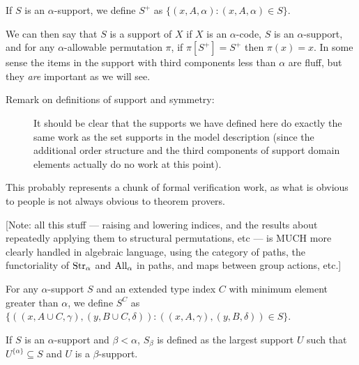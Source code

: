 If $S$ is an $\alpha$-support, we define $S^+$ as $\{(x,A,\alpha):(x,A,\alpha) \in S\}$.

We can then say that $S$ is a support of $X$ if $X$ is an $\alpha$-code, $S$ is an $\alpha$-support, and for any $\alpha$-allowable permutation $\pi$, if $\pi[S^+]=S^+$ then $\pi(x)=x$.  In some sense the items in the support with third components less than $\alpha$ are fluff, but they {\em are\/} important as we will see.

\begin{description}
\item[Remark on definitions of support and symmetry:]  It should be clear that the supports we have defined here do exactly the same work as the set supports in the model description (since the additional order structure and the third components of support domain elements actually do no work at this point).
\end{description}

This probably represents a chunk of formal verification work, as what is obvious to people is not always obvious to theorem provers.

\begin{definition}
\label {def:raise-lower-index}
[Note: all this stuff — raising and lowering indices, and the results about repeatedly applying them to structural permutations, etc — is MUCH more clearly handled in algebraic language, using the category of paths, the functoriality of $\mathrm{Str}_\alpha$ and $\mathrm{All}_\alpha$ in paths, and maps between group actions, etc.]

For any $\alpha$-support $S$ and an extended type index $C$ with minimum element greater than $\alpha$, we define $S^C$ as
$\{((x,A\cup C,\gamma),(y,B\cup C,\delta)):((x,A,\gamma),(y,B,\delta)) \in S\}$.

If $S$ is an $\alpha$-support and $\beta<\alpha$, $S_\beta$ is defined as the largest support $U$ such that $U^{\{\alpha\}} \subseteq S$ and $U$ is a $\beta$-support.
\end{definition}


